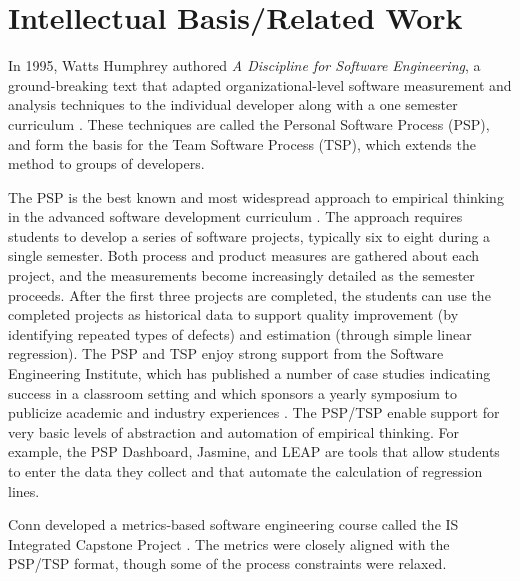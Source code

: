 \section{Intellectual Basis/Related Work}
\label{sec:related-work}



In 1995, Watts Humphrey authored {\em A Discipline for Software
Engineering}, a ground-breaking text that adapted organizational-level
software measurement and analysis techniques to the individual developer
along with a one semester curriculum \citep{Humphrey95}. These techniques are called the
Personal Software Process (PSP), and form the basis for the Team Software
Process (TSP), which extends the method to groups of developers. 

The PSP is the best known and most widespread approach to empirical
thinking in the advanced software development curriculum
\citep{Maletic01,Abrahamsson02,Lisack00,Carrington01,Ceberio-Verghese96,Borstler02}.  The approach
requires students to develop a series of software projects, typically six
to eight during a single semester.  Both process and product measures are
gathered about each project, and the measurements become increasingly
detailed as the semester proceeds. After the first three projects are
completed, the students can use the completed projects as historical data
to support quality improvement (by identifying repeated types of defects)
and estimation (through simple linear regression).  The PSP and TSP enjoy
strong support from the Software Engineering Institute, which has published
a number of case studies indicating success in a classroom setting and
which sponsors a yearly symposium to publicize academic and industry
experiences \citep{Ferguson97,Hayes97}.  The PSP/TSP enable support for very basic levels of
abstraction and automation of empirical thinking. For example, the PSP
Dashboard, Jasmine, and LEAP are tools that allow students to enter the
data they collect and that automate the calculation of regression lines.

Conn developed a metrics-based software engineering course called the 
IS Integrated Capstone Project \citep{Conn04}.  The metrics were closely aligned
with the PSP/TSP format, though some of the process constraints were relaxed. 

